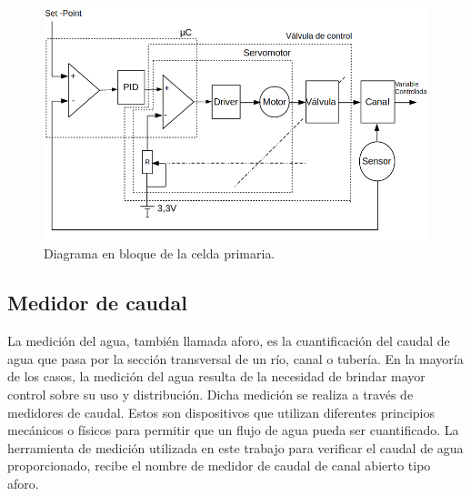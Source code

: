 \begin{figure}[htpb]
\centering
\includegraphics[scale=.65]{./Figures/DiagramaEnBloqueConServoMotor-V2.png}
\caption{Diagrama en bloque de la celda primaria.}
\label{fig:Diagrama en bloque de la celda primaria}
\end{figure}


\subsection{Medidor de caudal}
\label{subsec:Medidor de caudal}
La medición del agua, también llamada aforo, es la cuantificación del caudal de agua que pasa por la sección transversal de un río, canal o tubería. 
En la mayoría de los casos, la medición del agua resulta de la necesidad de brindar mayor control sobre su uso y distribución. Dicha medición se realiza a través de medidores de caudal. Estos son dispositivos que utilizan diferentes principios mecánicos o físicos para permitir que un flujo de agua pueda ser cuantificado. 
La herramienta de medición utilizada en este trabajo para verificar el caudal de agua proporcionado, recibe el nombre de medidor de caudal de canal abierto tipo aforo.

